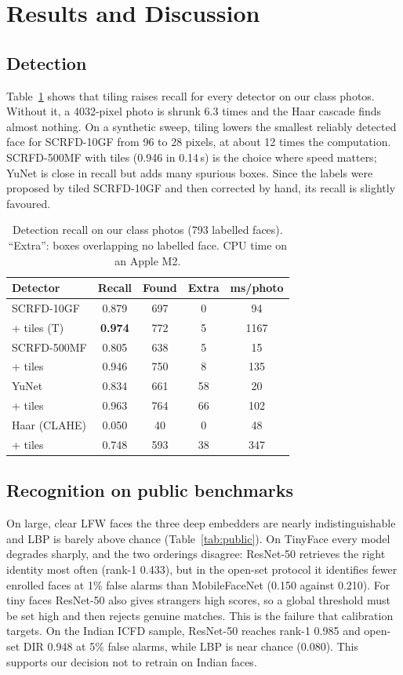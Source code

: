 \documentclass[conference,a4paper]{IEEEtran}
\begin{document}
\section{Results and Discussion}

\subsection{Detection}
Table~\ref{tab:det} shows that tiling raises recall for every detector on our class photos. Without it, a 4032-pixel photo is shrunk 6.3 times and the Haar cascade finds almost nothing. On a synthetic sweep, tiling lowers the smallest reliably detected face for SCRFD-10GF from 96 to 28 pixels, at about 12 times the computation. SCRFD-500MF with tiles (0.946 in 0.14\,s) is the choice where speed matters; YuNet is close in recall but adds many spurious boxes. Since the labels were proposed by tiled SCRFD-10GF and then corrected by hand, its recall is slightly favoured.

\begin{table}[t]
\caption{Detection recall on our class photos (793 labelled faces). ``Extra'': boxes overlapping no labelled face. CPU time on an Apple M2.}
\label{tab:det}
\centering
\setlength{\tabcolsep}{4pt}
\begin{tabular}{lcccc}
\toprule
Detector & Recall & Found & Extra & ms/photo \\
\midrule
SCRFD-10GF & 0.879 & 697 & 0 & 94 \\
\quad + tiles (T) & \textbf{0.974} & 772 & 5 & 1167 \\
SCRFD-500MF & 0.805 & 638 & 5 & 15 \\
\quad + tiles & 0.946 & 750 & 8 & 135 \\
YuNet & 0.834 & 661 & 58 & 20 \\
\quad + tiles & 0.963 & 764 & 66 & 102 \\
Haar (CLAHE) & 0.050 & 40 & 0 & 48 \\
\quad + tiles & 0.748 & 593 & 38 & 347 \\
\bottomrule
\end{tabular}
\end{table}

\subsection{Recognition on public benchmarks}
On large, clear LFW faces the three deep embedders are nearly indistinguishable and LBP is barely above chance (Table~\ref{tab:public}). On TinyFace every model degrades sharply, and the two orderings disagree: ResNet-50 retrieves the right identity most often (rank-1 0.433), but in the open-set protocol it identifies fewer enrolled faces at 1\% false alarms than MobileFaceNet (0.150 against 0.210). For tiny faces ResNet-50 also gives strangers high scores, so a global threshold must be set high and then rejects genuine matches. This is the failure that calibration targets. On the Indian ICFD sample, ResNet-50 reaches rank-1 0.985 and open-set DIR 0.948 at 5\% false alarms, while LBP is near chance (0.080). This supports our decision not to retrain on Indian faces.
\end{document}
